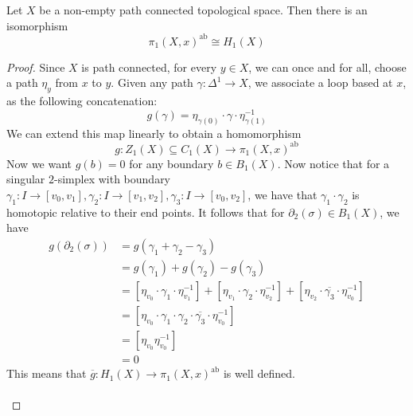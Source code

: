 \documentclass[a4paper]{article}
\begin{document}
\begin{thm}{}{} Let $X$ be a non-empty path connected topological space. Then there is an isomorphism $$\pi_1(X,x)^\text{ab}\cong H_1(X)$$ \tcbline
\begin{proof}
Since $X$ is path connected, for every $y\in X$, we can once and for all, choose a path $\eta_y$ from $x$ to $y$. Given any path $\gamma:\Delta^1\to X$, we associate a loop based at $x$, as the following concatenation: $$g(\gamma)=\eta_{\gamma(0)}\cdot\gamma\cdot\eta_{\gamma(1)}^{-1}$$ We can extend this map linearly to obtain a homomorphism $$g:Z_1(X)\subseteq C_1(X)\to\pi_1(X,x)^\text{ab}$$ Now we want $g(b)=0$ for any boundary $b\in B_1(X)$. Now notice that for a singular $2$-simplex with boundary $\gamma_1:I\to[v_0,v_1],\gamma_2:I\to[v_1,v_2],\gamma_3:I\to[v_0,v_2]$, we have that $\gamma_1\cdot\gamma_2$ is homotopic relative to their end points. It follows that for $\partial_2(\sigma)\in B_1(X)$, we have 
\begin{align*}
g(\partial_2(\sigma))&=g(\gamma_1+\gamma_2-\gamma_3)\\
&=g(\gamma_1)+g(\gamma_2)-g(\gamma_3)\\
&=[\eta_{v_0}\cdot\gamma_1\cdot\eta_{v_1}^{-1}]+[\eta_{v_1}\cdot\gamma_2\cdot\eta_{v_2}^{-1}]+[\eta_{v_2}\cdot\overline{\gamma_3}\cdot\eta_{v_0}^{-1}]\\
&=[\eta_{v_0}\cdot\gamma_1\cdot\gamma_2\cdot\overline{\gamma_3}\cdot\eta_{v_0}^{-1}]\\
&=[\eta_{v_0}\eta_{v_0}^{-1}]\\
&=0
\end{align*}
This means that $\overline{g}:H_1(X)\to\pi_1(X,x)^\text{ab}$ is well defined. \\~\\


\end{proof}
\end{thm}
\end{document}

